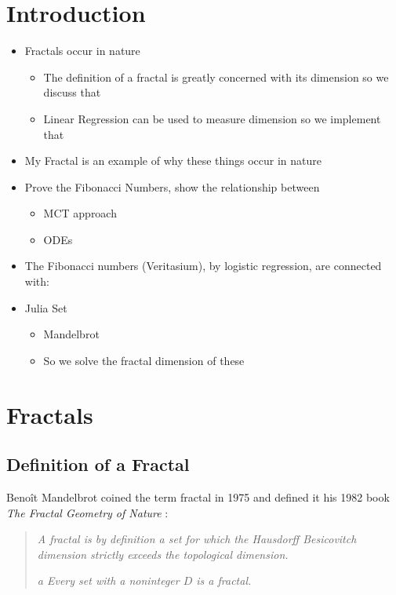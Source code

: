 \documentclass[11pt]{article}
\begin{document}
\section{Introduction}
\label{sec:org63e185a}
\begin{itemize}
\item Fractals occur in nature
\begin{itemize}
\item The definition of a fractal is greatly concerned with its dimension so we discuss that
\item Linear Regression can be used to measure dimension so we implement that
\end{itemize}
\item My Fractal is an example of why these things occur in nature
\item Prove the Fibonacci Numbers, show the relationship between
\begin{itemize}
\item MCT approach
\item ODEs
\end{itemize}
\item The Fibonacci numbers (Veritasium), by logistic regression, are connected with:
\item Julia Set
\begin{itemize}
\item Mandelbrot
\item So we solve the fractal dimension of these
\end{itemize}
\end{itemize}

\section{Fractals}
\label{sec:org2e7b843}
\subsection{Definition of a Fractal}
\label{sec:org0786efd}

Benoît Mandelbrot coined the term fractal in 1975 \cite{gomoryBenoitMandelbrot19242010} and defined it his 1982 book \emph{The Fractal Geometry of Nature} \cite[p. 15]{mandelbrotFractalGeometryNature1982} :

\begin{quote}
\emph{A fractal is by definition a set for which the Hausdorff Besicovitch dimension
strictly exceeds the topological dimension.}

\emph{a Every set with a noninteger \(D\) is a fractal.}
\end{quote}
\end{document}

